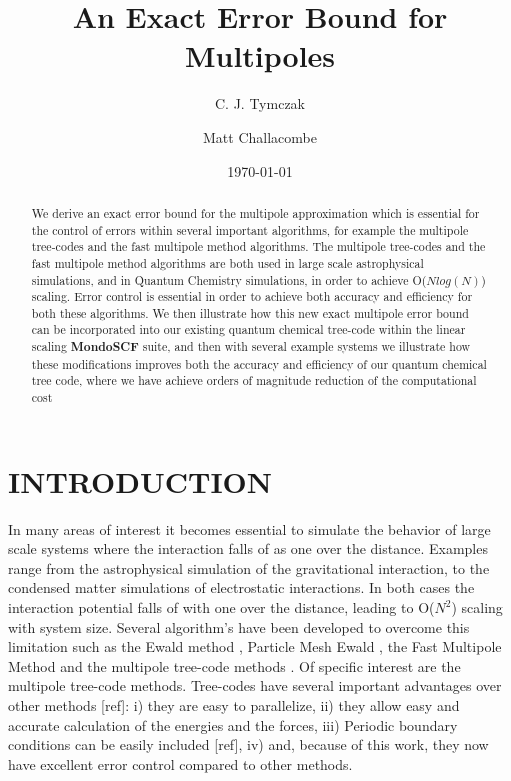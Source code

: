 \documentclass[prb,aps,nobibnotes,superbib,preprint]{revtex4}
\begin{document}
\title{An Exact Error Bound for Multipoles}

\author{C. J. Tymczak}
\author{Matt Challacombe}


\date{\today}

\begin{abstract}
We derive an exact error bound for the multipole approximation which is essential for the control of
errors within several important algorithms, for example the multipole tree-codes 
and the fast multipole method algorithms. 
%
The multipole tree-codes and the fast multipole method algorithms are both used in large scale astrophysical 
simulations, and in Quantum Chemistry simulations, in order to achieve {\cal O}($N log(N)$) 
scaling. 
%
Error control is essential in order to achieve both  accuracy and efficiency for both these algorithms. 
%
We then illustrate how this new exact multipole error bound can be incorporated into our existing 
quantum chemical tree-code within the linear scaling {\bf MondoSCF} suite,  
and then with several example systems we illustrate how these modifications improves both the accuracy and 
efficiency of our quantum chemical tree code, where we have achieve orders of magnitude reduction of the
computational cost
\end{abstract}


\maketitle

\section{INTRODUCTION}

In many areas of interest it becomes essential to simulate 
the behavior of large scale systems where the interaction 
falls of as one over the distance. Examples range from  the astrophysical simulation
of the gravitational interaction, to the condensed matter simulations of electrostatic interactions. 
In both cases the interaction potential falls of with one over the distance, 
leading to  {\cal O}($N^2$) scaling with system size. Several algorithm's have been developed to
overcome this limitation such as the Ewald method \cite{DFincham94}, 
Particle Mesh Ewald \cite{luty:94}, 
the Fast Multipole Method \cite{Singh93,shimada:94,singer:95a}
and the multipole tree-code methods \cite{Salmon94}. 
Of specific interest are the multipole tree-code methods. 
Tree-codes have several important advantages over other methods [ref]: i) they are easy to parallelize,
ii) they allow easy and accurate calculation of the energies and the forces, iii) Periodic boundary
conditions can be easily included [ref], iv) and, because of this work, they
now have excellent error control compared to other methods.
\end{document}

